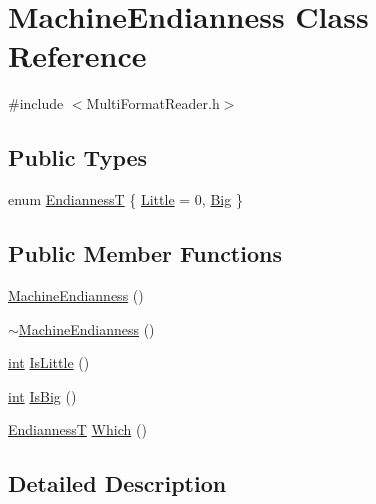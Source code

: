 \hypertarget{class_machine_endianness}{}\section{Machine\+Endianness Class Reference}
\label{class_machine_endianness}


{\ttfamily \#include $<$Multi\+Format\+Reader.\+h$>$}

\subsection*{Public Types}
\begin{DoxyCompactItemize}
\item 
enum \hyperlink{class_machine_endianness_a1d179c9c1da7949f5670f5654e0be09b}{EndiannessT} \{ \hyperlink{class_machine_endianness_a1d179c9c1da7949f5670f5654e0be09ba63849a8f1aad67b2313babb52a87922a}{Little} = 0, 
\hyperlink{class_machine_endianness_a1d179c9c1da7949f5670f5654e0be09ba08091e348453df47a2cb4be13cb3d3f4}{Big}
 \}
\end{DoxyCompactItemize}
\subsection*{Public Member Functions}
\begin{DoxyCompactItemize}
\item 
\hyperlink{class_machine_endianness_acdb5373110341a5434300effd2f4acff}{Machine\+Endianness} ()
\item 
\hyperlink{class_machine_endianness_a8114d8add537a2496df7b5dad224b03c}{$\sim$\+Machine\+Endianness} ()
\item 
\hyperlink{xmltok_8h_a5a0d4a5641ce434f1d23533f2b2e6653}{int} \hyperlink{class_machine_endianness_a0f433fcbb9f903165e33b031a50ce45f}{Is\+Little} ()
\item 
\hyperlink{xmltok_8h_a5a0d4a5641ce434f1d23533f2b2e6653}{int} \hyperlink{class_machine_endianness_aca4724668105a14a2d64ce1a1e638aea}{Is\+Big} ()
\item 
\hyperlink{class_machine_endianness_a1d179c9c1da7949f5670f5654e0be09b}{EndiannessT} \hyperlink{class_machine_endianness_adda6ec1bf6187752653044a93f6370e9}{Which} ()
\end{DoxyCompactItemize}


\subsection{Detailed Description}


